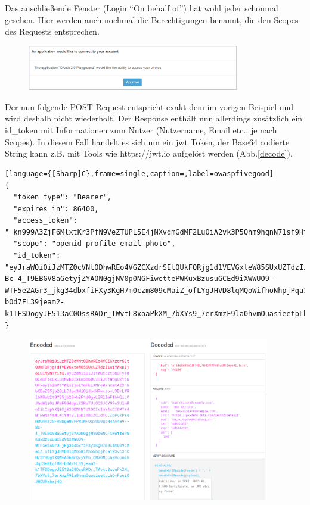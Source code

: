 \documentclass[notitlepage, hidelinks]{article}
\begin{document}
Das anschließende Fenster (Login ``On behalf of'') hat wohl jeder schonmal gesehen. Hier werden auch nochmal die Berechtigungen benannt, die den Scopes des Requests entsprechen.
 
\begin{figure}[H]
\centering
  \includegraphics[width=350px]{images/oauthex2.png}
  \caption{}
  \label{}
\end{figure}

Der nun folgende POST Request entspricht exakt dem im vorigen Beispiel und wird deshalb nicht wiederholt. Der Response enthält nun allerdings zusätzlich ein id\_token mit Informationen zum Nutzer (Nutzername, Email etc., je nach Scopes). In diesem Fall handelt es sich um ein jwt Token, der Base64 codierte String kann z.B. mit Tools wie https://jwt.io aufgelöst werden (Abb.\ref{decode}).


\begin{lstlisting}[language={[Sharp]C},frame=single,caption=,label=owaspfivegood]
{
  "token_type": "Bearer",
  "expires_in": 86400,
  "access_token": "_kn999A3ZjF6MlxtKr3PfN9VeZTUPL5E4jNXvdmGdMF2LuOiA2vk3P5Qhm9hqnN71sf9HtA0",
  "scope": "openid profile email photo",
  "id_token": "eyJraWQiOiJzMTZ0cVNtODhwREo4VGZCXzdrSEtQUkFQRjg1d1VEVGxteW85SUxUZTdzIiwiYWxnIjoiUlMyNTYifQ.eyJzdWIiOiJiYWQtc2t5bGFya0BleGFtcGxlLmNvbSIsIm5hbWUiOiJCYWQgU2t5bGFyayIsImVtYWlsIjoiYmFkLXNreWxhcmtAZXhhbXBsZS5jb20iLCJpc3MiOiJodHRwczovL3BrLWRlbW8ub2t0YS5jb20vb2F1dGgyL2RlZmF1bHQiLCJhdWQiOiJPaF9GdUpiZ2RuTUJOQ3JCVG9uSUlmRnIiLCJpYXQiOjE2ODM1NTU2ODIsImV4cCI6MTY4NjE0NzY4MiwiYW1yIjpbInB3ZCJdfQ.ZoPvZPaomdOnnz2GFRGbgaW7PPWIMFDqSBp0gbN4An4a9F-Bc-4_T9EBGV8aGetyjZYAON0gjNV0p0NGFiwettePWKuxBzusuGCEd9iXWWUO9-WTF5e2AGr3_jkg34dbxfiFXy3KgH7m0czm809cMaiZ_ofLYgJHVD8lqMQoWifhoNhpjPqa19Svc3nCHzSYHUgTXQWvA56NmQvyVPh_OM7GMpc6zHopmihJqt3eREof8N-bOd7FL39jeam2-k1TFSDogyJE513aC0OssRADr_TWvtL8xoaPkXM_7bXYs9_7erXmzF9la0hvmOuasieetpLhOvFeoiOJWCU9xhxj4Q"
} 
\end{lstlisting}

\begin{figure}[H]
\centering
  \includegraphics[width=400px]{images/decoded.png}
  \caption{}
  \label{}
\end{figure}
\end{document}
